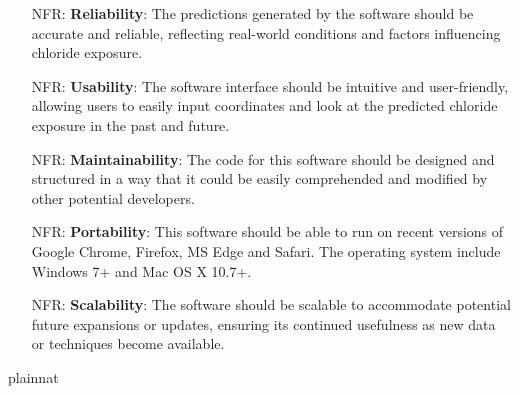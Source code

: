 \documentclass[12pt, titlepage]{article}
\newcounter{nfrnum} %
\begin{document}
\noindent \begin{itemize}

\item[NFR\refstepcounter{nfrnum}\thenfrnum \label{NFR_Reliability}:]   \textbf{Reliability}: The predictions generated by the software should be accurate and reliable, reflecting real-world conditions and factors influencing chloride exposure.

\item[NFR\refstepcounter{nfrnum}\thenfrnum \label{NFR_Usability}:] \textbf{Usability}: The software interface should be intuitive and user-friendly, allowing users to easily input coordinates and look at the predicted chloride exposure in the past and future.

\item[NFR\refstepcounter{nfrnum}\thenfrnum \label{NFR_Maintainability}:] \textbf{Maintainability}: The code for this software should be designed and structured in a way that it could be easily comprehended and modified by other potential developers.

\item[NFR\refstepcounter{nfrnum}\thenfrnum \label{NFR_Portability}:]  \textbf{Portability}: This software should be able to run on recent versions of Google Chrome, Firefox, MS Edge and Safari. The operating system include Windows 7+ and Mac OS X 10.7+.

\item[NFR\refstepcounter{nfrnum}\thenfrnum \label{NFR_Scalability}:]   \textbf{Scalability}: The software should be scalable to accommodate potential future expansions or updates, ensuring its continued usefulness as new data or techniques become available.

\end{itemize}


 {plainnat}


\newpage{}
\end{document}
